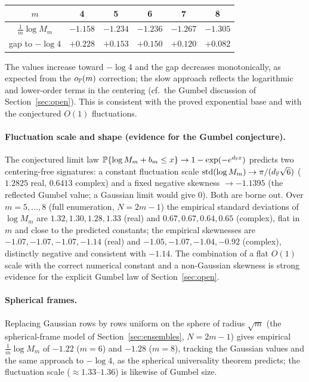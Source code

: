 \begin{center}
\begin{tabular}{c|ccccc}
$m$ & 4 & 5 & 6 & 7 & 8\\\hline
$\tfrac1m\log M_m$ & $-1.158$ & $-1.234$ & $-1.236$ & $-1.267$ & $-1.305$\\
gap to $-\log4$ & $+0.228$ & $+0.153$ & $+0.150$ & $+0.120$ & $+0.082$
\end{tabular}
\end{center}

The values increase toward $-\log4$ and the gap decreases monotonically, as
expected from the $o_{\mathbb{P}}(m)$ correction; the slow approach reflects the
logarithmic and lower-order terms in the centering (cf.\ the Gumbel discussion of
Section~\ref{sec:open}).  This is consistent with the proved exponential base and
with the conjectured $O(1)$ fluctuations.

\paragraph{Fluctuation scale and shape (evidence for the Gumbel conjecture).}
The conjectured limit law $\mathbb{P}\{\log M_m+b_m\le x\}\to1-\exp(-e^{d_{\mathbb{F}} x})$ predicts
two centering-free signatures: a constant fluctuation scale
$\operatorname{std}(\log M_m)\to\pi/(d_{\mathbb{F}}\sqrt6)$ ($1.2825$ real, $0.6413$ complex)
and a fixed negative skewness $\to-1.1395$ (the reflected Gumbel value; a Gaussian
limit would give $0$).  Both are borne out.  Over $m=5,\dots,8$ (full enumeration,
$N=2m-1$) the empirical standard deviations of $\log M_m$ are
$1.32,1.30,1.28,1.33$ (real) and $0.67,0.67,0.64,0.65$ (complex), flat in $m$ and
close to the predicted constants; the empirical skewnesses are
$-1.07,-1.07,-1.07,-1.14$ (real) and $-1.05,-1.07,-1.04,-0.92$ (complex),
distinctly negative and consistent with $-1.14$.  The combination of a flat $O(1)$
scale with the correct numerical constant and a non-Gaussian skewness is strong
evidence for the explicit Gumbel law of Section~\ref{sec:open}.

\paragraph{Spherical frames.}
Replacing Gaussian rows by rows uniform on the sphere of radius $\sqrt m$ (the
spherical-frame model of Section~\ref{sec:ensembles}, $N=2m-1$) gives empirical
$\tfrac1m\log M_m$ of $-1.22$ ($m=6$) and $-1.28$ ($m=8$), tracking the Gaussian
values and the same approach to $-\log4$, as the spherical universality theorem
predicts; the fluctuation scale ($\approx1.33$--$1.36$) is likewise of Gumbel size.

